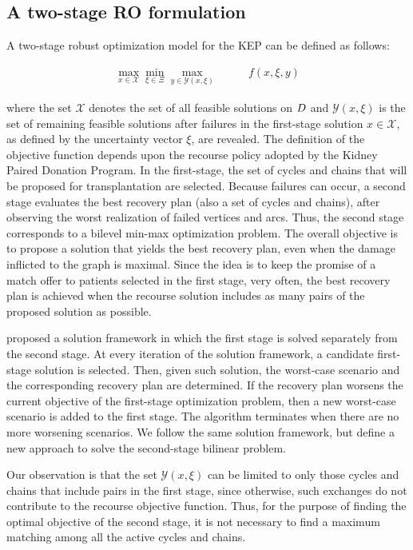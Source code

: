 \documentclass{article}
\begin{document}
\subsection{A two-stage RO formulation}
A two-stage robust optimization model for the KEP can be defined as follows:

\vspace{-0.5cm}
\begin{subequations}
	\label{eq:Robust1i}
	\begin{align}
		\label{eq:Robust1}
		\max_{x \in \mathcal{X}} \min_{\xi \in \Xi} \max_{y \in \mathcal{Y}(x,\xi)} \qquad& f(x, \xi, y)
	\end{align}
\end{subequations}

where the set $\mathcal{X}$ denotes the set of all feasible solutions on $D$ and $\mathcal{Y}(x,\xi)$ is the set of remaining feasible solutions after failures in the first-stage solution $x \in \mathcal{X}$, as defined by the uncertainty vector $\xi$, are revealed. The definition of the objective function depends upon the recourse policy adopted by the Kidney Paired Donation Program.
In the first-stage, the set of cycles and chains that will be proposed for transplantation are selected. Because failures can occur, a second stage evaluates the best recovery plan (also a set of cycles and chains), after observing the worst realization of failed vertices and arcs. Thus, the second stage corresponds to a bilevel min-max optimization problem. The overall objective is to propose a solution that yields the best recovery plan, even when the damage inflicted to the graph is maximal. Since the idea is to keep the promise of a match offer to patients selected in the first stage, very often, the best recovery plan is achieved when the recourse solution includes as many pairs of the proposed solution as possible.

\cite{Carvalho2020} proposed a solution framework in which the first stage is solved separately from the second stage.  At every iteration of the solution framework, a candidate first-stage solution is selected. Then, given such solution, the worst-case scenario and the corresponding recovery plan are determined. If the recovery plan worsens the current objective of the first-stage optimization problem, then a new worst-case scenario is added to the first stage. The algorithm terminates when there are no more worsening scenarios. We follow the same solution framework, but define a new approach to solve the second-stage bilinear problem.

Our observation is that the set $\mathcal{Y}(x,\xi)$ can be limited to only those cycles and chains that include pairs in the first stage, since otherwise, such exchanges do not contribute to the recourse objective function. Thus, for the purpose of finding the optimal objective of the second stage, it is not necessary to find a maximum matching among all the active cycles and chains.





	
	
\end{document}

